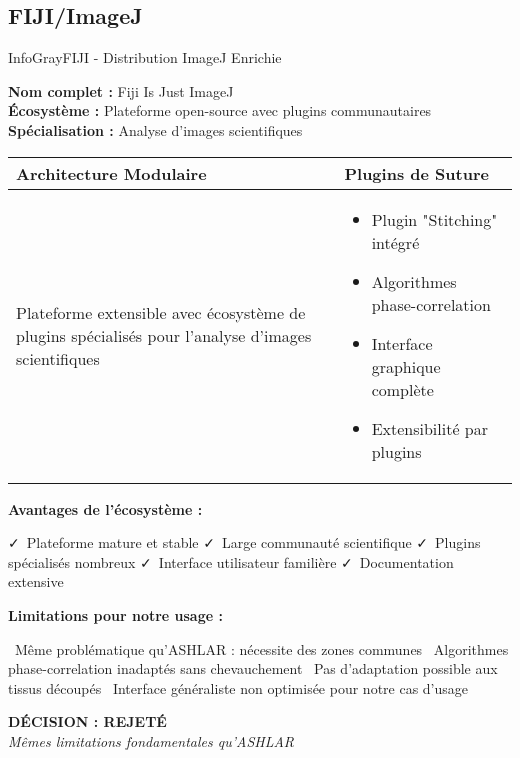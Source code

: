 \documentclass[11pt,a4paper]{article}
\newcommand{\pro}[1]{\textcolor{SuccessGreen}{\faCheck\ #1}}
\newcommand{\con}[1]{\textcolor{DangerRed}{\faTimes\ #1}}
\begin{document}
\subsection{FIJI/ImageJ}

\begin{techbox}{InfoGray}{FIJI - Distribution ImageJ Enrichie}

\textbf{Nom complet :} Fiji Is Just ImageJ \\
\textbf{Écosystème :} Plateforme open-source avec plugins communautaires \\
\textbf{Spécialisation :} Analyse d'images scientifiques

\vspace{0.5cm}

\begin{tabularx}{\textwidth}{|X|X|}
\hline
\rowcolor{LightGray}
\textbf{Architecture Modulaire} & \textbf{Plugins de Suture} \\
\hline
Plateforme extensible avec écosystème de plugins spécialisés pour l'analyse d'images scientifiques &
\begin{itemize}[nosep]
\item Plugin "Stitching" intégré
\item Algorithmes phase-correlation
\item Interface graphique complète
\item Extensibilité par plugins
\end{itemize} \\
\hline
\end{tabularx}

\vspace{0.5cm}

\textbf{Avantages de l'écosystème :}
\begin{itemize}[leftmargin=*]
    \pro{Plateforme mature et stable}
    \pro{Large communauté scientifique}
    \pro{Plugins spécialisés nombreux}
    \pro{Interface utilisateur familière}
    \pro{Documentation extensive}
\end{itemize}

\textbf{Limitations pour notre usage :}
\begin{itemize}[leftmargin=*]
    \con{Même problématique qu'ASHLAR : nécessite des zones communes}
    \con{Algorithmes phase-correlation inadaptés sans chevauchement}
    \con{Pas d'adaptation possible aux tissus découpés}
    \con{Interface généraliste non optimisée pour notre cas d'usage}
\end{itemize}

\begin{center}
\textbf{\textcolor{DangerRed}{DÉCISION : REJETÉ}}\\
\textit{Mêmes limitations fondamentales qu'ASHLAR}
\end{center}

\end{techbox}
\end{document}
